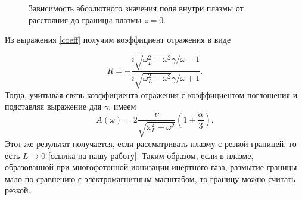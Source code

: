 \documentclass[12pt,a4paper]{article}
\numberwithin{equation}{section}
\begin{document}
\begin{figure}[!ht]	
	\caption{Зависимость абсолютного значения  поля внутри плазмы от расстояния до границы плазмы $z=0$.}
    \label{E_small}
\end{figure}
Из выражения \eqref{coeff} получим коэффициент отражения в виде

\begin{equation}
    \label{coeff1_small}
    R = -\frac{i\sqrt{\omega_L^2-\omega^2}\gamma/\omega - 1}{i\sqrt{\omega_L^2-\omega^2}\gamma/\omega + 1}.
\end{equation}
Тогда, учитывая связь коэффициента отражения с коэффициентом поглощения и подставляя выражение для $\gamma$, имеем
\begin{equation}
\label{coeff2_small}
    A\left(\omega\right) = 2 \frac{\nu}{\sqrt{\omega_L^2-\omega^2}}\left(1+\frac{\alpha}{3}\right).
\end{equation}
Этот же результат получается, если рассматривать плазму с резкой границей, то есть $L \to 0$ [ссылка на нашу работу]. Таким образом, если в плазме, образованной при многофотонной ионизации инертного газа, размытие границы мало по сравнению с электромагнитным масштабом, то границу можно считать резкой.
\end{document}
